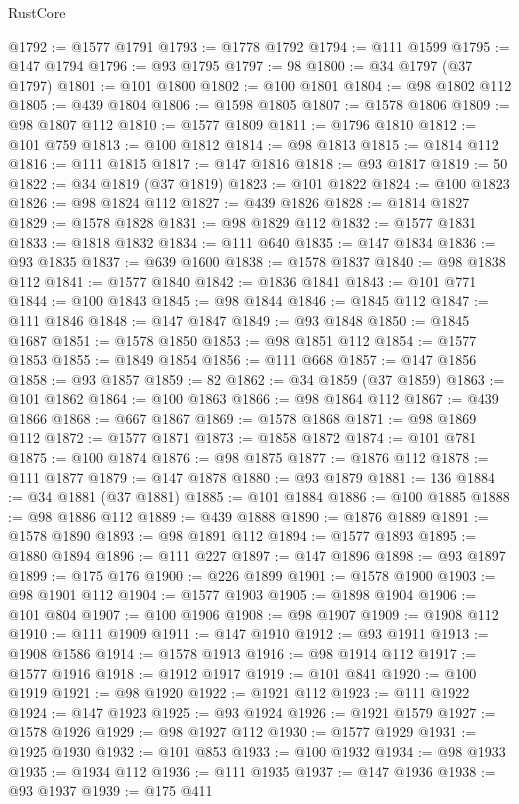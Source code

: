 \begin{lexlean}{RustCore}
\begin{coremodule}
@1792 := @1577 @1791
@1793 := @1778 @1792
@1794 := @111 @1599
@1795 := @147 @1794
@1796 := @93 @1795
@1797 := 98
@1800 := @34 @1797 (@37 @1797)
@1801 := @101 @1800
@1802 := @100 @1801
@1804 := @98 @1802 @112
@1805 := @439 @1804
@1806 := @1598 @1805
@1807 := @1578 @1806
@1809 := @98 @1807 @112
@1810 := @1577 @1809
@1811 := @1796 @1810
@1812 := @101 @759
@1813 := @100 @1812
@1814 := @98 @1813
@1815 := @1814 @112
@1816 := @111 @1815
@1817 := @147 @1816
@1818 := @93 @1817
@1819 := 50
@1822 := @34 @1819 (@37 @1819)
@1823 := @101 @1822
@1824 := @100 @1823
@1826 := @98 @1824 @112
@1827 := @439 @1826
@1828 := @1814 @1827
@1829 := @1578 @1828
@1831 := @98 @1829 @112
@1832 := @1577 @1831
@1833 := @1818 @1832
@1834 := @111 @640
@1835 := @147 @1834
@1836 := @93 @1835
@1837 := @639 @1600
@1838 := @1578 @1837
@1840 := @98 @1838 @112
@1841 := @1577 @1840
@1842 := @1836 @1841
@1843 := @101 @771
@1844 := @100 @1843
@1845 := @98 @1844
@1846 := @1845 @112
@1847 := @111 @1846
@1848 := @147 @1847
@1849 := @93 @1848
@1850 := @1845 @1687
@1851 := @1578 @1850
@1853 := @98 @1851 @112
@1854 := @1577 @1853
@1855 := @1849 @1854
@1856 := @111 @668
@1857 := @147 @1856
@1858 := @93 @1857
@1859 := 82
@1862 := @34 @1859 (@37 @1859)
@1863 := @101 @1862
@1864 := @100 @1863
@1866 := @98 @1864 @112
@1867 := @439 @1866
@1868 := @667 @1867
@1869 := @1578 @1868
@1871 := @98 @1869 @112
@1872 := @1577 @1871
@1873 := @1858 @1872
@1874 := @101 @781
@1875 := @100 @1874
@1876 := @98 @1875
@1877 := @1876 @112
@1878 := @111 @1877
@1879 := @147 @1878
@1880 := @93 @1879
@1881 := 136
@1884 := @34 @1881 (@37 @1881)
@1885 := @101 @1884
@1886 := @100 @1885
@1888 := @98 @1886 @112
@1889 := @439 @1888
@1890 := @1876 @1889
@1891 := @1578 @1890
@1893 := @98 @1891 @112
@1894 := @1577 @1893
@1895 := @1880 @1894
@1896 := @111 @227
@1897 := @147 @1896
@1898 := @93 @1897
@1899 := @175 @176
@1900 := @226 @1899
@1901 := @1578 @1900
@1903 := @98 @1901 @112
@1904 := @1577 @1903
@1905 := @1898 @1904
@1906 := @101 @804
@1907 := @100 @1906
@1908 := @98 @1907
@1909 := @1908 @112
@1910 := @111 @1909
@1911 := @147 @1910
@1912 := @93 @1911
@1913 := @1908 @1586
@1914 := @1578 @1913
@1916 := @98 @1914 @112
@1917 := @1577 @1916
@1918 := @1912 @1917
@1919 := @101 @841
@1920 := @100 @1919
@1921 := @98 @1920
@1922 := @1921 @112
@1923 := @111 @1922
@1924 := @147 @1923
@1925 := @93 @1924
@1926 := @1921 @1579
@1927 := @1578 @1926
@1929 := @98 @1927 @112
@1930 := @1577 @1929
@1931 := @1925 @1930
@1932 := @101 @853
@1933 := @100 @1932
@1934 := @98 @1933
@1935 := @1934 @112
@1936 := @111 @1935
@1937 := @147 @1936
@1938 := @93 @1937
@1939 := @175 @411

\end{coremodule}
\end{lexlean}
